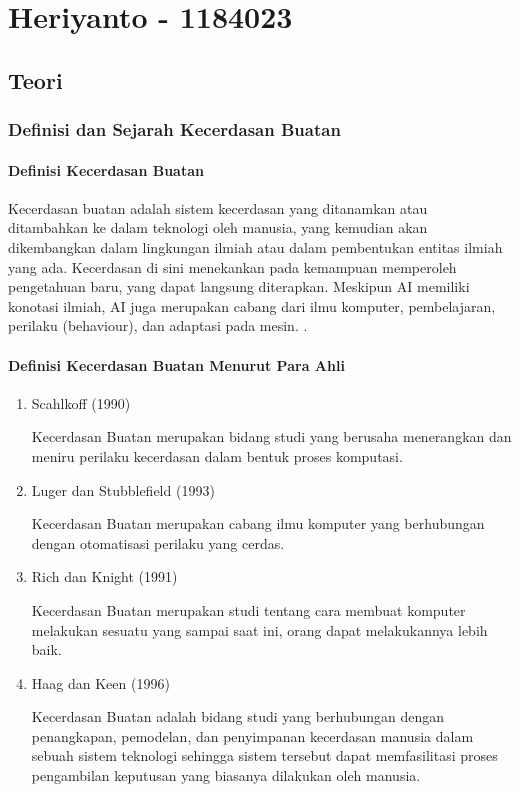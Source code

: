 \chapter{Heriyanto - 1184023}

\section{Teori}

\subsection{Definisi dan Sejarah Kecerdasan Buatan}

\subsubsection{Definisi Kecerdasan Buatan}
Kecerdasan buatan adalah sistem kecerdasan yang ditanamkan atau ditambahkan ke dalam teknologi oleh manusia, yang kemudian akan dikembangkan dalam lingkungan ilmiah atau dalam pembentukan entitas ilmiah yang ada. Kecerdasan di sini menekankan pada kemampuan memperoleh pengetahuan baru, yang dapat langsung diterapkan. Meskipun AI memiliki konotasi ilmiah, AI juga merupakan cabang dari ilmu komputer, pembelajaran, perilaku (behaviour), dan adaptasi pada mesin. \cite{purwanti2017analisis}. 

\subsubsection{Definisi Kecerdasan Buatan Menurut Para Ahli}
\begin{enumerate}
    \item Scahlkoff (1990)
    
    \par Kecerdasan Buatan merupakan bidang studi yang berusaha menerangkan dan meniru perilaku kecerdasan dalam bentuk proses komputasi.\cite{ai2011kecerdasan}
    
    \item Luger dan Stubblefield (1993)
    
    \par Kecerdasan Buatan merupakan cabang ilmu komputer yang berhubungan dengan otomatisasi perilaku yang cerdas.\cite{ai2011kecerdasan}
    
    \item Rich dan Knight (1991)
    
    \par Kecerdasan Buatan merupakan studi tentang cara membuat komputer melakukan sesuatu yang sampai saat ini, orang dapat melakukannya lebih baik.\cite{ai2011kecerdasan}
    
    \item Haag dan Keen (1996)
    
    \par Kecerdasan Buatan adalah bidang studi yang berhubungan dengan penangkapan, pemodelan, dan penyimpanan kecerdasan manusia dalam sebuah sistem teknologi sehingga sistem tersebut dapat memfasilitasi proses pengambilan keputusan yang biasanya dilakukan oleh manusia.\cite{ai2011kecerdasan}
\end{enumerate}


